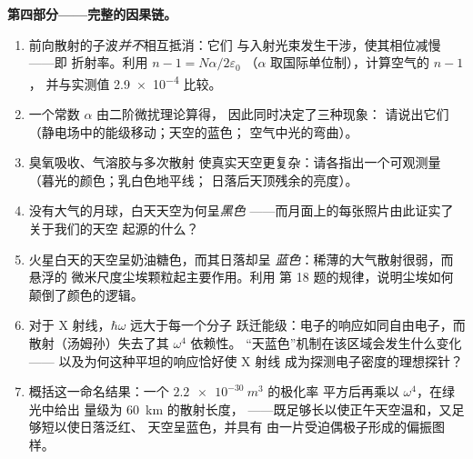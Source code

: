 \begin{problem}
\medskip\noindent\textbf{第四部分——完整的因果链。}
\begin{enumerate}[resume]
  \item 前向散射的子波\emph{并不}相互抵消：它们
        与入射光束发生干涉，使其相位减慢——即
        折射率。利用 $n - 1 = N\alpha/2\varepsilon_0$
        （$\alpha$ 取国际单位制），计算空气的 $n - 1$，
        并与实测值 \num{2.9e-4} 比较。
  \item 一个常数 $\alpha$ 由二阶微扰理论算得，
        因此同时决定了三种现象：
        请说出它们（静电场中的能级移动；天空的蓝色；
        空气中光的弯曲）。
  \item 臭氧吸收、气溶胶与多次散射
        使真实天空更复杂：请各指出一个可观测量
        （暮光的颜色；乳白色地平线；
        日落后天顶残余的亮度）。
  \item 没有大气的月球，白天天空为何呈\emph{黑色}
——而月面上的每张照片由此证实了关于我们的天空
        起源的什么？
  \item 火星白天的天空呈奶油糖色，而其日落却呈
        \emph{蓝色}：稀薄的大气散射很弱，而悬浮的
        微米尺度尘埃颗粒起主要作用。利用
        第 18 题的规律，说明尘埃如何颠倒了颜色的逻辑。
  \item 对于 X 射线，$\hbar\omega$ 远大于每一个分子
        跃迁能级：电子的响应如同自由电子，而
        散射（汤姆孙）失去了其 $\omega^4$ 依赖性。
        “天蓝色”机制在该区域会发生什么变化——
        以及为何这种平坦的响应恰好使 X 射线
        成为探测电子密度的理想探针？
  \item 概括这一命名结果：一个 $\qty{2.2e-30}{m^3}$ 的极化率
        平方后再乘以 $\omega^4$，在绿光中给出
        量级为 \qty{60}{km} 的散射长度，
——既足够长以使正午天空温和，又足够短以使日落泛红、
        天空呈蓝色，并具有
        由一片受迫偶极子形成的偏振图样。
\end{enumerate}
\end{problem}
